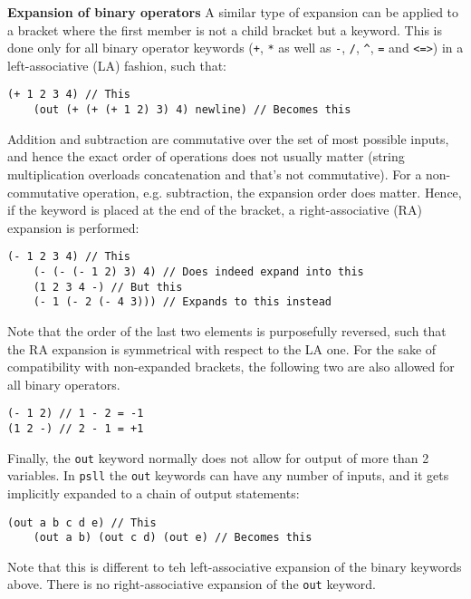 \documentclass[aip,jcp,reprint,footinbib]{revtex4-1}
\let\tt\texttt
\newcommand\psll{\texttt{psll}\xspace}
\begin{document}
\textbf{Expansion of binary operators} A similar type of expansion can be applied to a bracket where the first member is not a child bracket but a keyword. This is done only for all binary operator keywords (\tt{+}, \tt{*} as well as \tt{-}, \tt{/}, \tt{\^}, \tt{=} and \tt{<=>}) in a left-associative (LA) fashion, such that:
\begin{lstlisting}[language=psll,aboveskip=3pt,belowskip=-2pt,frame=none,numbers=none]
    (+ 1 2 3 4) // This
    (out (+ (+ (+ 1 2) 3) 4) newline) // Becomes this
\end{lstlisting}
Addition and subtraction are commutative over the set of most possible inputs, and hence the exact order of operations does not usually matter (string multiplication overloads concatenation and that's not commutative). For a non-commutative operation, e.g. subtraction, the expansion order does matter. Hence, if the keyword is placed at the end of the bracket, a right-associative (RA) expansion is performed:
\begin{lstlisting}[language=psll,aboveskip=3pt,belowskip=-2pt,frame=none,numbers=none]
    (- 1 2 3 4) // This
    (- (- (- 1 2) 3) 4) // Does indeed expand into this
    (1 2 3 4 -) // But this
    (- 1 (- 2 (- 4 3))) // Expands to this instead
\end{lstlisting}
Note that the order of the last two elements is purposefully reversed, such that the RA expansion is symmetrical with respect to the LA one. For the sake of compatibility with non-expanded brackets, the following two are also allowed for all binary operators.
\begin{lstlisting}[language=psll,aboveskip=3pt,belowskip=-2pt,frame=none,numbers=none]
(- 1 2) // 1 - 2 = -1
(1 2 -) // 2 - 1 = +1
\end{lstlisting}

Finally, the \tt{out} keyword normally does not allow for output of more than 2 variables. In \psll the \tt{out} keywords can have any number of inputs, and it gets implicitly expanded to a chain of output statements: 
\begin{lstlisting}[language=psll,aboveskip=3pt,belowskip=-2pt,frame=none,numbers=none]
    (out a b c d e) // This
    (out a b) (out c d) (out e) // Becomes this
\end{lstlisting}
Note that this is different to teh left-associative expansion of the binary keywords above. There is no right-associative expansion of the \tt{out} keyword.
\end{document}
